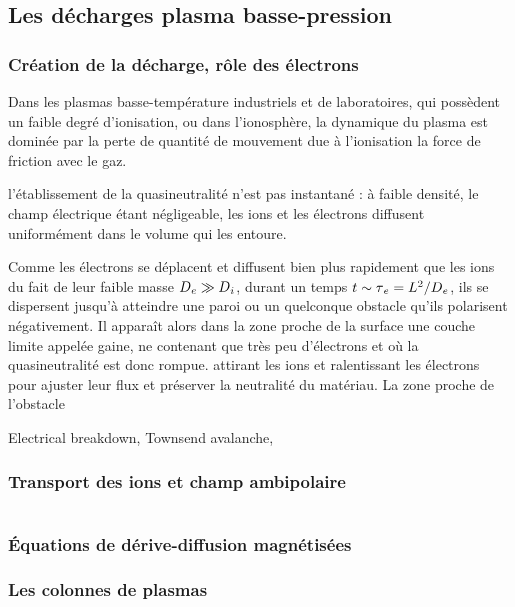 \begin{refsection}
\subsection{Les décharges plasma basse-pression}
\label{1-transportAmbipolaire}

\subsubsection{Création de la décharge, rôle des électrons}

Dans les plasmas basse-température industriels et de laboratoires, qui
possèdent un faible degré d'ionisation, ou dans l'ionosphère, la dynamique du
plasma est dominée par la perte de quantité de mouvement due à l'ionisation la force de friction avec
le gaz.

l'établissement de la quasineutralité n'est pas instantané : à faible densité,
le champ électrique étant négligeable, les ions et les électrons diffusent
uniformément dans le volume qui les entoure.

Comme les électrons se déplacent et diffusent bien plus rapidement que les ions
du fait de leur faible masse $D{_{e}}\gg D{_{i}}$, durant un temps
$t\sim \tau{_{e}}=L^{{2}}/D{_{e}}$, ils se dispersent jusqu'à atteindre
une paroi ou un quelconque obstacle qu'ils polarisent négativement. Il apparaît
alors dans la zone proche de la surface une couche limite appelée gaine, ne
contenant que très peu d'électrons et où la quasineutralité est donc rompue. 
attirant les ions et ralentissant les électrons pour ajuster leur flux et
préserver la neutralité du matériau. La zone proche de l'obstacle



Electrical breakdown, Townsend avalanche,
\subsubsection{Transport des ions et champ ambipolaire}
\begin{equation}
\label{derivediffusion}
\end{equation}
\subsubsection{Équations de dérive-diffusion magnétisées}

\subsubsection{Les colonnes de plasmas}
\parencite{RosenbluthSimon}


\end{refsection}
